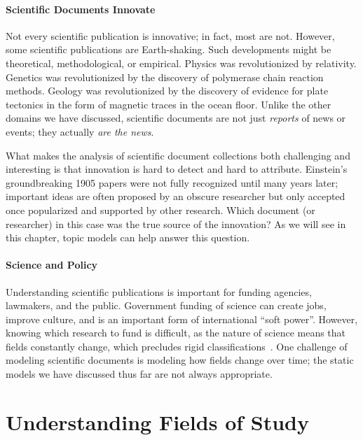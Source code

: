 \paragraph{Scientific Documents Innovate}

Not every scientific publication is innovative;
in fact, most are not.  However, some scientific publications are
Earth-shaking. Such developments might be theoretical, methodological, or empirical.
Physics was revolutionized by relativity.
Genetics was revolutionized by the discovery of polymerase chain reaction methods.
Geology was revolutionized by the discovery of evidence for plate tectonics in the form of magnetic traces in the ocean floor. Unlike the other domains we have
discussed, scientific documents are not just \emph{reports} of news or events;
they actually \emph{are the news}.

What makes the analysis of scientific document collections both challenging and
interesting is that innovation is hard to detect and hard to attribute.
Einstein's groundbreaking 1905 papers were not fully recognized until many years
later; important ideas are often proposed by an obscure researcher but only accepted
once popularized and supported by other research. Which document (or researcher)
in this case was the true source of the innovation?  As we will see in this
chapter, topic models can help answer this question.

\paragraph{Science and Policy}

Understanding scientific publications is important for funding agencies,
lawmakers, and the public.  Government funding of science can create jobs,
improve culture, and is an important form of international ``soft power''.
However, knowing which research to fund is difficult, as the nature of science
means that fields constantly change, which precludes rigid
classifications~\citep{szostak-04}.  One challenge of modeling scientific
documents is modeling how fields change over time; the static models we have
discussed thus far are not always appropriate.

\section{Understanding Fields of Study}
\label{sec:sci_fields}

